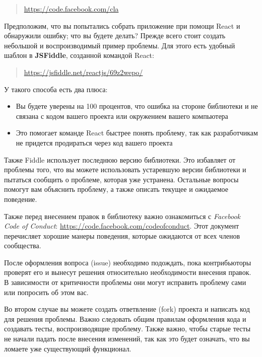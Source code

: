\begin{quotation}
	\href{https://code.facebook.com/cla}{https://code.facebook.com/cla}
\end{quotation}

Предположим, что вы попытались собрать приложение при помощи React и обнаружили ошибку; что вы будете делать? Прежде всего стоит создать небольшой и воспроизводимый пример проблемы. Для этого есть удобный шаблон в \textbf{JSFiddle}, созданной командой React:

\begin{quotation}
	\href{https://jsfiddle.net/reactjs/69z2wepo/}{https://jsfiddle.net/reactjs/69z2wepo/}
\end{quotation}

У такого способа есть два плюса:

\begin{itemize}
  \item Вы будете уверены на 100 процентов, что ошибка на стороне библиотеки и не связана с кодом вашего проекта или окружением вашего компьютера
  \item Это помогает команде React быстрее понять проблему, так как разработчикам не придется продираться через код вашего проекта
\end{itemize}

Также Fiddle использует последнюю версию библиотеки. Это избавляет от проблемы того, что вы можете использовать устаревшую версии библиотеки и пытаться сообщить о проблеме, которая уже устранена. Остальные вопросы помогут вам объяснить проблему, а также описать текущее и ожидаемое поведение.

Также перед внесением правок в библиотеку важно ознакомиться с \textit{Facebook Code of Conduct}: \href{https://code.facebook.com/codeofconduct}{https://code.facebook.com/codeofconduct}. Этот документ перечисляет хорошие манеры поведения, которые ожидаются от всех членов сообщества.

После оформления вопроса (issue) необходимо подождать, пока контрибьюторы проверят его и вынесут решения относительно необходимости внесения правок. В зависимости от критичности проблемы они могут исправить проблему сами или попросить об этом вас.

Во втором случае вы можете создать ответвление (fork) проекта и написать код для решения проблемы. Важно следовать общим правилам оформления кода и создавать тесты, воспроизводящие проблему. Также важно, чтобы старые тесты не начали падать после внесения изменений, так как это будет означать, что вы ломаете уже существующий функционал. 

